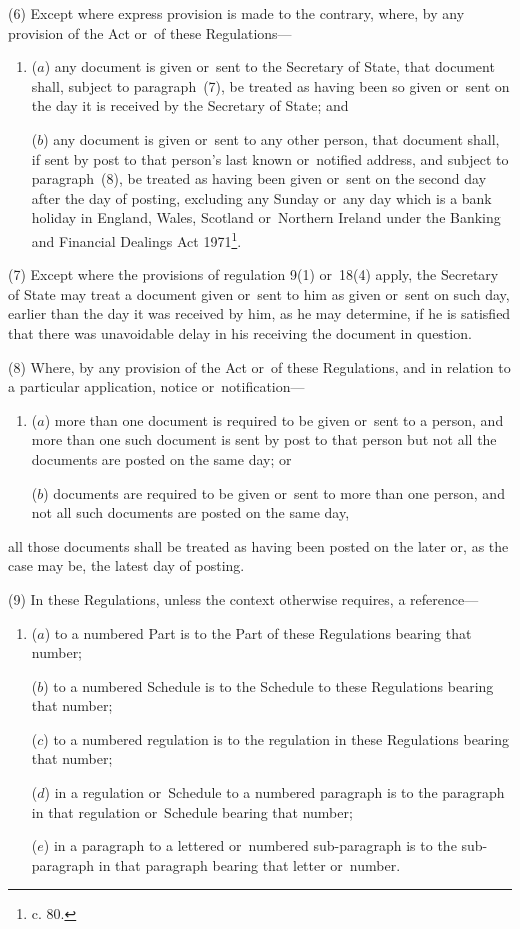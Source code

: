 \documentclass[a4paper,12pt]{article}
\begin{document}
(6) Except where express provision is made to the contrary, where, by any provision of the Act or~of these Regulations—
\begin{enumerate}\item[]
($a$) any document is given or~sent to the Secretary of State, that document shall, subject to paragraph~(7), be treated as having been so given or~sent on the day it is received by the Secretary of State; and

($b$) any document is given or~sent to any 
other  %
person, that document shall, if sent by post to that person’s last known or~notified address, and subject to paragraph~(8), be treated as having been given or~sent on the second day after the day of posting, excluding any Sunday or~any day which is a bank holiday in England, Wales, Scotland or~Northern Ireland under the Banking and Financial Dealings Act 1971\footnote{ c. 80.}.
\end{enumerate}

(7) Except where the provisions of regulation 
9(1) or~18(4)  %
apply, the Secretary of State may treat a document given or~sent to him as given or~sent on such day, earlier than the day it was received by him, as he may determine, if he is satisfied that there was unavoidable delay in his receiving the document in question.

(8) Where, by any provision of the Act or~of these Regulations, and in relation to a particular application, notice or~notification—
\begin{enumerate}\item[]
($a$) more than one document is required to be given or~sent to a person, and more than one such document is sent by post to that person but not all the documents are posted on the same day; or

($b$) documents are required to be given or~sent to more than one person, and not all such documents are posted on the same day,
\end{enumerate}
all those documents shall be treated as having been posted on the later or, as the case may be, the latest day of posting.

(9) In these Regulations, unless the context otherwise requires, a reference—
\begin{enumerate}\item[]
($a$) to a numbered Part is to the Part of these Regulations bearing that number;

($b$) to a numbered Schedule is to the Schedule to these Regulations bearing that number;

($c$) to a numbered regulation is to the regulation in these Regulations bearing that number;

($d$) in a regulation or~Schedule to a numbered paragraph is to the paragraph in that regulation or~Schedule bearing that number;

($e$) in a paragraph to a lettered or~numbered sub-paragraph is to the sub-paragraph in that paragraph bearing that letter or~number.
\end{enumerate}
\end{document}
